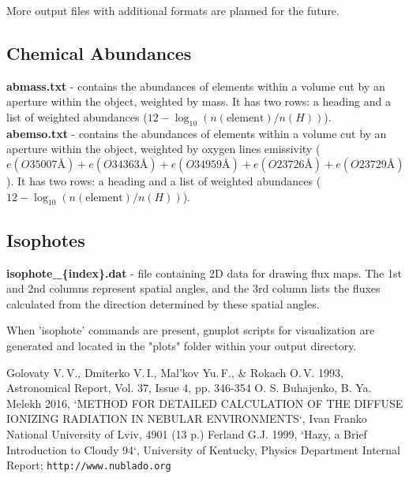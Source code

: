 \documentclass[a4paper]{article}
\begin{document}
More output files with additional formats are planned for the future.

\subsection{Chemical Abundances}
{\bf abmass.txt} - contains the abundances of elements within a volume cut by an aperture within the object, weighted by mass.
It has two rows: a heading and a list of weighted abundances ($12 - \log_{10}(n(\text{element})/n(H))$). \\

{\bf abemso.txt} - contains the abundances of elements within a volume cut by an aperture within the object, weighted by oxygen
lines emissivity ($e(O3  5007\text{\AA}) + e(O3  4363\text{\AA}) + e(O3  4959\text{\AA}) + e(O2  3726\text{\AA}) + e(O2  3729\text{\AA})$).
It has two rows: a heading and a list of weighted abundances ($12 - \log_{10}(n(\text{element})/n(H))$).

\subsection{Isophotes}

{\bf isophote\_\{index\}.dat} - file containing 2D data for drawing flux maps.
The 1st and 2nd columns represent spatial angles, and the 3rd column lists the fluxes calculated from the direction determined by these spatial angles.

When 'isophote' commands are present, gnuplot scripts for visualization are generated and located in the "plots"
folder within your output directory.


\begin{thebibliography}{3}
{\small
{} Golovaty V.\,V., Dmiterko V.\,I., Mal'kov Yu.\,F., \& Rokach O.\,V. 1993, Astronomical Report, Vol. 37, Issue 4, pp. 346-354
 O. S. Buhajenko, B. Ya. Melekh 2016, `METHOD FOR DETAILED CALCULATION OF THE DIFFUSE IONIZING RADIATION IN NEBULAR ENVIRONMENTS`, Ivan Franko National University of Lviv, 4901 (13 p.) 
 Ferland G.J. 1999, `Hazy, a Brief Introduction to Cloudy 94`, University of Kentucky, Physics Department Internal Report; \texttt{http://www.nublado.org}
}
\end{thebibliography}
\end{document}
